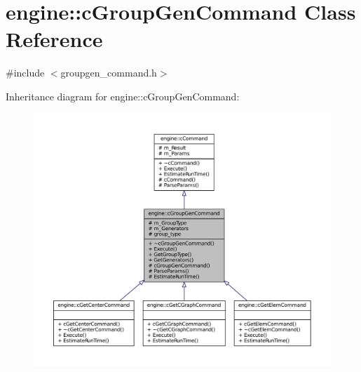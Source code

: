 \hypertarget{classengine_1_1cGroupGenCommand}{\section{engine\-:\-:c\-Group\-Gen\-Command \-Class \-Reference}
\label{classengine_1_1cGroupGenCommand}
}


{\ttfamily \#include $<$groupgen\-\_\-command.\-h$>$}



\-Inheritance diagram for engine\-:\-:c\-Group\-Gen\-Command\-:
\nopagebreak
\begin{figure}[H]
\begin{center}
\leavevmode
\includegraphics[width=350pt]{classengine_1_1cGroupGenCommand__inherit__graph}
\end{center}
\end{figure}


